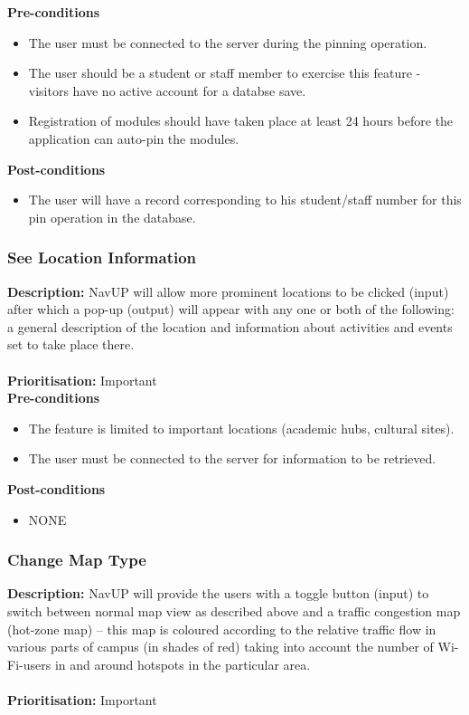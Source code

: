 \documentclass[runningheads,a4paper]{article}
\begin{document}
  
\textbf{Pre-conditions}
\begin{itemize}
 	\item The user must be connected to the server during the pinning operation.
	\item The user should be a student or staff member to exercise this feature - visitors have no active account for a databse save.
	\item Registration of modules should have taken place at least 24 hours before the application can auto-pin the modules.
\end{itemize}
  
\textbf{Post-conditions}
\begin{itemize}
  	\item The user will have a record corresponding to his student/staff number for this pin operation in the database.
\end{itemize}

\subsubsection{See Location Information}

\textbf{Description:}  NavUP will allow more prominent locations to be clicked (input) after which a pop-up (output) will appear with any one or both of the following: a general description of the location and information about activities and events set to take place there.\\\\
\noindent
\textbf{Prioritisation:} Important\\
  
  
\textbf{Pre-conditions}
\begin{itemize}
 	\item The feature is limited to important locations (academic hubs, cultural sites).
	\item The user must be connected to the server for information to be retrieved.
\end{itemize}
  
\textbf{Post-conditions}
\begin{itemize}
  	\item NONE
\end{itemize}

\subsubsection{Change Map Type}

\textbf{Description:}  NavUP will provide the users with a toggle button (input) to switch between normal map view as described above and a traffic congestion map (hot-zone map) – this map is coloured according to the relative traffic flow in various parts of campus (in shades of red) taking into account the number of Wi-Fi-users in and around hotspots in the particular area.\\\\
\noindent
\textbf{Prioritisation:} Important\\
  
\end{document}
